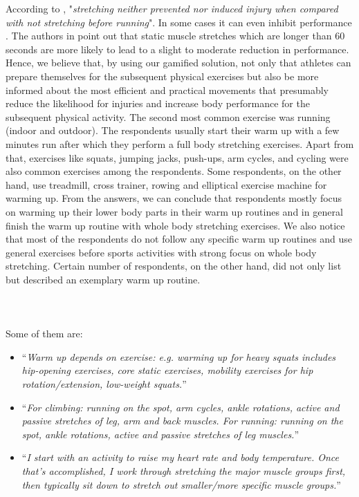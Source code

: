 According to \cite{pereles2012large}, "\textit{stretching neither prevented nor induced injury when compared with not stretching before running}". In some cases it can even inhibit performance  \cite{kay2012effect}. The authors  in  \cite{kay2012effect} point out that static muscle stretches which are longer than 60 seconds are more likely to lead to a slight to moderate reduction in performance. Hence, we believe that, by using our gamified solution, not only that athletes can prepare themselves for the subsequent physical exercises but also be more informed about the most efficient and practical movements that presumably reduce the likelihood for injuries and increase body performance for the subsequent physical activity. The second most common exercise was running (indoor and outdoor). The respondents usually start their warm up with a few minutes run after which they perform a full body stretching exercises. Apart from that, exercises like squats, jumping jacks, push-ups, arm cycles, and cycling were also common exercises among the respondents. Some respondents, on the other hand, use treadmill, cross trainer, rowing and elliptical exercise machine for warming up. From the answers, we can conclude that respondents mostly focus on warming up their lower body parts in their warm up routines and in general finish the warm up routine with whole body stretching exercises. We also notice that most of the respondents do not follow any specific warm up routines and use general exercises before sports activities with strong focus on whole body stretching. Certain number of respondents, on the other hand, did not only list but described an exemplary warm up routine. \\\\\\\\Some of them are: 
\begin{itemize}
\item ``\textit{Warm up depends on exercise: e.g. warming up for heavy squats includes hip-opening exercises, core static exercises, mobility exercises for hip rotation/extension, low-weight squats.}''
\item ``\textit{For climbing: running on the spot, arm cycles, ankle rotations, active and passive stretches of leg, arm and back muscles.  For running: running on the spot, ankle rotations, active and passive stretches of leg muscles.}''
\item ``\textit{I start with an activity to raise my heart rate and body temperature. Once that's accomplished, I work through stretching the major muscle groups first, then typically sit down to stretch out smaller/more specific muscle groups.}''
\end{itemize}
